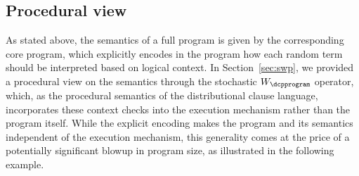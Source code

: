 \subsection{Procedural view}
As stated above, the semantics of a full \dcproblogsty program is given by the corresponding core program, which explicitly encodes in the program how each random term should be interpreted based on logical context. 
In Section~\ref{sec:swp}, we provided a procedural view on the semantics through the stochastic $W_\dcpprogram$ operator, which, as the procedural semantics of the distributional clause language, incorporates these context checks into the execution mechanism rather than the program itself. While the explicit encoding makes the program and its semantics independent of the execution mechanism, this generality comes at the price of a potentially significant blowup in program size, as illustrated in the following example.



